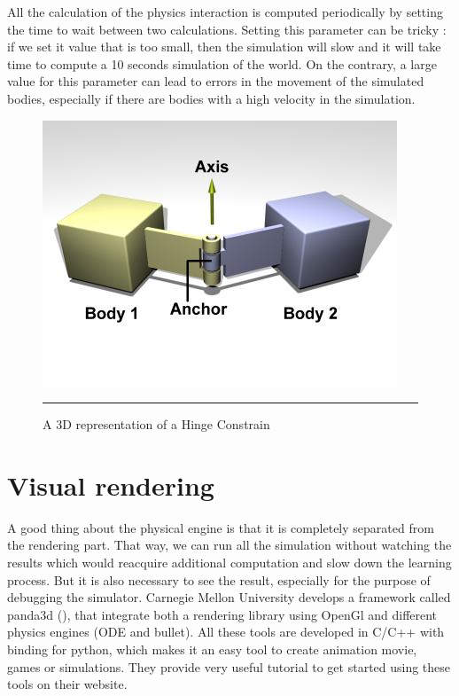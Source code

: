     All the calculation of the physics interaction is computed periodically by setting the time to wait between two calculations. Setting this parameter can be tricky : if we set it value that is too small, then the simulation will slow and it will take time to compute a 10 seconds simulation of the world. On the contrary, a large value for this parameter can lead to errors in the movement of the simulated bodies, especially if there are bodies with a high velocity in the simulation.

\begin{figure}[htbp]
    \centering
    \includegraphics[scale=0.5]{Figures/hinge.jpg}
    \rule{35em}{0.5pt}
    \caption[A Hinge Constraint]{A 3D representation of a Hinge Constrain}
    \label{fig:Hinge}
\end{figure}

\section{Visual rendering}
A good thing about the physical engine is that it is completely separated from the rendering part. That way, we can run all the simulation without watching the results which would reacquire additional computation and slow down the learning process. But it is also necessary to see the result, especially for the purpose of debugging the simulator. Carnegie Mellon University develops a framework called panda3d (\cite{panda3d}), that integrate both a rendering library using OpenGl and different physics engines (ODE and bullet). All these tools are developed in C/C++ with binding for python, which makes it an easy tool to create animation movie, games or simulations. They provide very useful tutorial to get started using these tools on their website.

